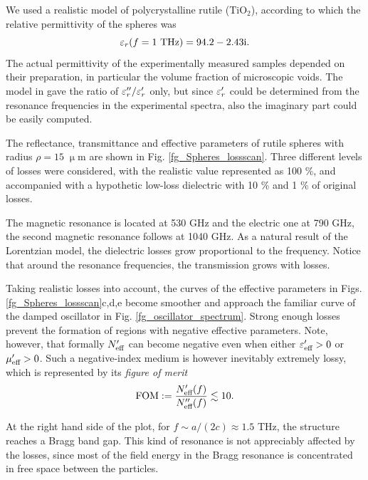 We used a realistic model \cite{baumard1977_epsilon_TiO2} of polycrystalline rutile (TiO$_{2}$), according to which the relative permittivity of the spheres was 
$$\varepsilon_r(f = 1\text{ THz}) = 94.2-2.43\text{i}.$$ 
The actual permittivity of the experimentally measured samples depended on their preparation, in particular the volume fraction of microscopic voids. The model in \cite{baumard1977_epsilon_TiO2} gave the ratio of $\varepsilon_r''/\varepsilon_r'$ only, but since $\varepsilon_r'$ could be determined from the resonance frequencies in the experimental spectra, also the imaginary part could be easily computed.

The reflectance, transmittance and effective parameters of rutile spheres with radius $\rho=15\;\upmu$m are shown in Fig. \ref{fg_Spheres_lossscan}. Three different levels of losses were considered, with the realistic value represented as 100 \%, and accompanied with a hypothetic low-loss dielectric with 10 \% and 1 \% of original losses. 

The magnetic resonance is located at 530 GHz and the electric one at 790 GHz, the second magnetic resonance follows at 1040 GHz. As a natural result of the Lorentzian model, the dielectric losses grow proportional to the frequency. Notice that around the resonance frequencies, the transmission grows with losses.

Taking realistic losses into account, the curves of the effective parameters in Figs. \ref{fg_Spheres_lossscan}c,d,e become smoother and approach the familiar curve of the damped oscillator in Fig. \ref{fg_oscillator_spectrum}. Strong enough losses prevent the formation of regions with negative effective parameters. Note, however, that formally $N_{\text{eff} }'$ can become negative \cite[pp. 12--15]{pazoutova2011dp} even when either $\varepsilon_{\text{eff} }'>0$ or $\mu_{\text{eff} }'>0$. Such a negative-index medium is however inevitably extremely lossy, which is represented by its \textit{figure of merit}
\begin{equation} \text{FOM} := \frac{N_{\text{eff} }'(f)}{N_{\text{eff} }''(f)} \lesssim 10. \label{eq_}\end{equation}

At the right hand side of the plot, for $f \sim a/(2c) \approx 1.5$ THz, the structure reaches a Bragg band gap. This kind of resonance is not appreciably affected by the losses, since most of the field energy in the Bragg resonance is concentrated in free space between the particles.

